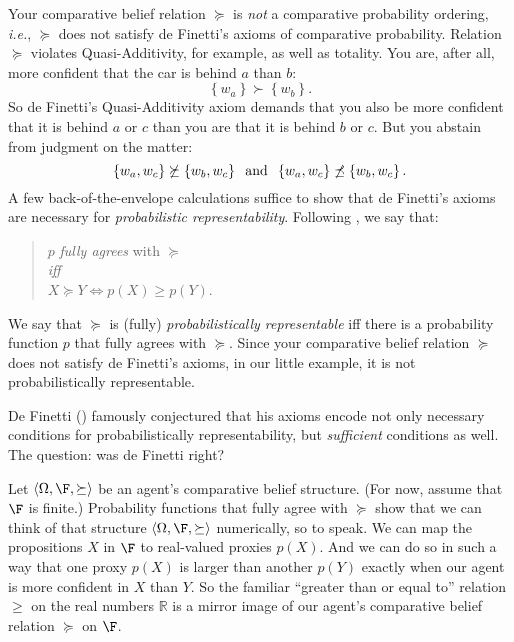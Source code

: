 Your comparative belief relation $\succeq$ is \textit{not} a comparative probability ordering, \textit{i.e.}, $\succeq$ does not satisfy de Finetti's axioms of comparative probability. Relation $\succeq$ violates Quasi-Additivity, for example, as well as totality. You are, after all, more confident that the car is behind $a$ than $b$: 
$$ \left\{w_a\right\}\succ\left\{w_b\right\}. $$
So de Finetti's Quasi-Additivity axiom demands that you also be more confident that it is behind $a$ or $c$ than you are that it is behind $b$ or $c$. But you abstain from judgment on the matter: 
$$ \left\{w_a,w_c\right\}\not\succeq\left\{w_b,w_c\right\}\hspace*{2mm}\textrm{and}\hspace*{2mm}\left\{w_a,w_c\right\}\not\preceq\left\{w_b,w_c\right\}. $$
A few back-of-the-envelope calculations suffice to show that de Finetti's axioms are necessary for \textit{probabilistic representability}. Following \citet{Savage1954}, we say that:
\begin{quote}\centering
$p$ \emph{fully agrees} with $\succeq$\\
\textit{iff}\\
$X\succeq Y \Leftrightarrow p(X)\geq p(Y)$.
\end{quote}
We say that $\succeq$ is (fully) \emph{probabilistically representable} iff there is a probability function $p$ that fully agrees with $\succeq$. Since your comparative belief relation $\succeq$ does not satisfy de Finetti's axioms, in our little example, it is not probabilistically representable.

De Finetti (\citeyear{deFinetti1951}) famously conjectured that his axioms encode not only necessary conditions for probabilistically representability, but \textit{sufficient} conditions as well. The question: was de Finetti right?

Let $\left<\Omega,\F,\succeq\right>$ be an agent's comparative belief structure. (For now, assume that $\F$ is finite.) Probability functions that fully agree with $\succeq$ show that we can think of that structure $\left<\Omega,\F,\succeq\right>$ numerically, so to speak. We can map the propositions $X$ in $\F$ to real-valued proxies $p(X)$. And we can do so in such a way that one proxy $p(X)$ is larger than another $p(Y)$ exactly when our agent is more confident in $X$ than $Y$. So the familiar ``greater than or equal to'' relation $\geq$ on the real numbers $\mathbb{R}$ is a mirror image of our agent's comparative belief relation $\succeq$ on $\F$.

